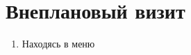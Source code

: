 \section{Внеплановый визит}\label{sec:sec11_1}
\begin{enumerate}[\thesection .1]
	\item Находясь в меню
\end{enumerate}